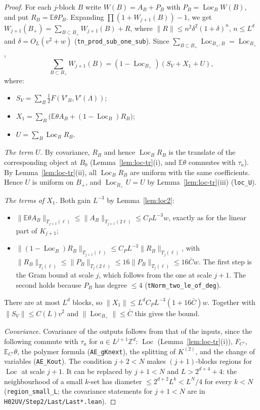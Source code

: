 \documentclass[11pt]{amsart}
\theoremstyle{definition}
\theoremstyle{remark}
\numberwithin{equation}{section}
\newcommand{\Z}{\mathbb{Z}}
\newcommand{\E}{\mathbb{E}}
\newcommand{\Loc}{\operatorname{Loc}}
\begin{document}
\begin{proof}
For each $j$-block $B$ write $W(B)=A_B+P_B$ with $P_B=\Loc_BW(B)$, and put
$R_B=\E\theta P_B$. Expanding $\prod(1+W_{j+1}(B))-1$, we get
$W_{j+1}(B_+)=\sum_{B\subset B_+}W_{j+1}(B)+R$, where $\|R\|\le n^2\delta^2(1+\delta)^n$,
$n\le L^d$ and $\delta=O_L(v^2+w)$ (\texttt{tn\_prod\_sub\_one\_sub}). Since
$\sum_{B\subset B_+}\Loc_{B_+,B}=\Loc_{B_+}$,
\[
  \sum_{B\subset B_+}W_{j+1}(B)=(1-\Loc_{B_+})(S_V+X_1+U),
\]
where:
\begin{itemize}
\item $S_V=\sum_B\frac12F(V'_B,V'(\Lambda))$;
\item $X_1=\sum_B\bigl(\E\theta A_B+(1-\Loc_B)R_B\bigr)$;
\item $U=\sum_B\Loc_BR_B$.
\end{itemize}

\emph{The term $U$.} By covariance, $R_B$ and hence $\Loc_BR_B$ is the translate of the
corresponding object at $B_0$ (Lemma~\ref{lem:loc-tr}(i), and $\E\theta$ commutes with
$\tau_a$). By Lemma~\ref{lem:loc-tr}(ii), all $\Loc_BR_B$ are uniform with the same
coefficients. Hence $U$ is uniform on $B_+$, and $\Loc_{B_+}U=U$ by
Lemma~\ref{lem:loc-tr}(iii) (\texttt{loc\_U}).

\emph{The terms of $X_1$.} Both gain $L^{-3}$ by Lemma~\ref{lem:loc2}:
\begin{itemize}
\item $\|\E\theta A_B\|_{T_{j+1}(\ell)}\le\|A_B\|_{T_{j+1}(2\ell)}\le C_PL^{-3}w$, exactly as for
  the linear part of $K_{j+1}$;
\item $\|(1-\Loc_B)R_B\|_{T_{j+1}(\ell)}\le C_PL^{-3}\|R_B\|_{T_j(\ell)}$, with
  $\|R_B\|_{T_j(\ell)}\le\|P_B\|_{T_j(2\ell)}\le16\|P_B\|_{T_j(\ell)}\le16\bar Cw$. The first step
  is the Gram bound at scale $j$, which follows from the one at scale $j+1$. The second holds
  because $P_B$ has degree $\le4$ (\texttt{tNorm\_two\_le\_of\_deg}).
\end{itemize}
There are at most $L^d$ blocks, so $\|X_1\|\le L^dC_PL^{-3}(1+16\bar C)w$. Together with
$\|S_V\|\le C(L)v^2$ and $\|\Loc_{B_+}\|\le\bar C$ this gives the bound.

\emph{Covariance.} Covariance of the outputs follows from that of the inputs, since the
following commute with $\tau_a$ for $a\in L^{j+1}\Z^d$: $\Loc$ (Lemma~\ref{lem:loc-tr}(i)),
$F_{C'}$, $\E_{C'}\theta$, the polymer formula (\texttt{AE\_gKnext}), the splitting of $K^{(2)}$,
and the change of variables (\texttt{AE\_Kout}). The condition $j+2<N$ makes $(j+1)$-blocks
regions for $\Loc$ at scale $j+1$. It can be replaced by $j+1<N$ and $L>2^{d+4}+4$: the
neighbourhood of a small $k$-set has diameter $\le2^{d+2}L^k<L^N/4$ for every $k<N$
(\texttt{region\_small\_L}; the covariance statements for $j+1<N$ are in \texttt{H02UV/Step2/Last/Last*.lean}).
\end{proof}
\end{document}
